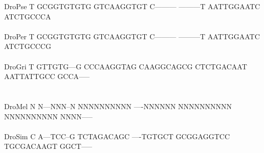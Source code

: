 \documentclass[11pt,twoside,reqno,a4paper]{article}
\begin{document}
{DroPse	T	GCGGTGTGTG	GTCAAGGTGT	C---------	---------T	AATTGGAATC	ATCTGCCCA\\
\hspace*{7\charwidth}\hspace*{1\charwidth}\hspace*{1\charwidth}\hspace*{1\charwidth}\hspace*{1\charwidth}\hspace*{1\charwidth}\hspace*{1\charwidth}\\
DroPer	T	GCGGTGTGTG	GTCAAGGTGT	C---------	---------T	AATTGGAATC	ATCTGCCCG\\
\hspace*{7\charwidth}\hspace*{1\charwidth}\hspace*{1\charwidth}\hspace*{1\charwidth}\hspace*{1\charwidth}\hspace*{1\charwidth}\hspace*{1\charwidth}\\
DroGri	T	GTTGTG---G	CCCAAGGTAG	CAAGGCAGCG	CTCTGACAAT	AATTATTGCC	GCCA-----\\
\hspace*{7\charwidth}\hspace*{1\charwidth}\hspace*{1\charwidth}\hspace*{1\charwidth}\hspace*{1\charwidth}\hspace*{1\charwidth}\hspace*{1\charwidth}\\
\\
DroMel	N	N---NNN--N	NNNNNNNNNN	----NNNNNN	NNNNNNNNNN	NNNNNNNNNN	NNNN-----\\
\hspace*{7\charwidth}\hspace*{1\charwidth}\hspace*{1\charwidth}\hspace*{1\charwidth}\hspace*{1\charwidth}\hspace*{1\charwidth}\hspace*{1\charwidth}\\
DroSim	C	A---TCC--G	TCTAGACAGC	----TGTGCT	GCGGAGGTCC	TGCGACAAGT	GGCT-----\\
\hspace*{7\charwidth}\hspace*{1\charwidth}\hspace*{1\charwidth}\hspace*{1\charwidth}\hspace*{1\charwidth}\hspace*{1\charwidth}\hspace*{1\charwidth}\\
}
\end{document}

